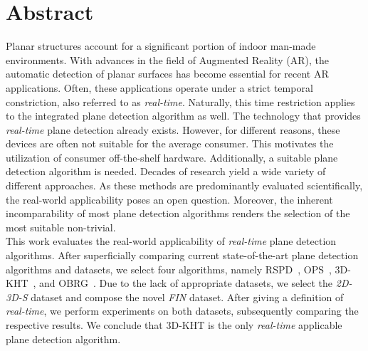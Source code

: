 \documentclass[main.tex]{subfiles}
\begin{document}
\chapter*{Abstract}
\thispagestyle{empty}
Planar structures account for a significant portion of indoor man-made environments.
With advances in the field of Augmented Reality (AR), the automatic detection of planar surfaces has become essential for recent AR applications. Often, these applications operate under a strict temporal constriction, also referred to as \textit{real-time}. Naturally, this time restriction applies to the integrated plane detection algorithm as well. The technology that provides \textit{real-time} plane detection already exists. However, for different reasons, these devices are often not suitable for the average consumer. This motivates the utilization of consumer off-the-shelf hardware. Additionally, a suitable plane detection algorithm is needed. Decades of research yield a wide variety of different approaches. As these methods are predominantly evaluated scientifically, the real-world applicability poses an open question. Moreover, the inherent incomparability of most plane detection algorithms renders the selection of the most suitable non-trivial.\\
\phantom{test} This work evaluates the real-world applicability of \textit{real-time} plane detection algorithms. After superficially comparing current state-of-the-art plane detection algorithms and datasets, we select four algorithms, namely RSPD~\cite{Araújo_Oliveira_2020}, OPS~\cite{Sun_Mordohai_2019}, 3D-KHT~\cite{LimbergerOliveira2015HT3D}, and OBRG~\cite{Vo_Truong-Hong_Laefer_Bertolotto_2015}. Due to the lack of appropriate datasets, we select the \textit{2D-3D-S} dataset and compose the novel \textit{FIN} dataset. After giving a definition of \textit{real-time}, we perform experiments on both datasets, subsequently comparing the respective results. We conclude that 3D-KHT is the only \textit{real-time} applicable plane detection algorithm.
\end{document}
